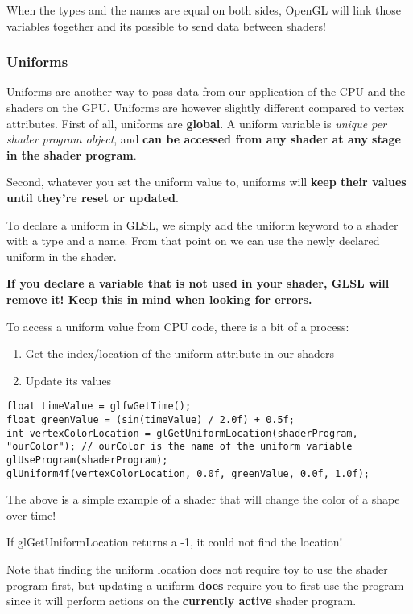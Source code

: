 \documentclass{article}
\begin{document}
When the types and the names are equal on both sides, OpenGL will link those variables together and its possible to send data between shaders!

\subsubsection{Uniforms}

Uniforms are another way to pass data from our application of the CPU and the shaders on the GPU. Uniforms are however slightly different compared to vertex attributes. First of all, uniforms are \textbf{global}. A uniform variable is \emph{unique per shader program object}, and \textbf{can be accessed from any shader at any stage in the shader program}.

Second, whatever you set the uniform value to, uniforms will \textbf{keep their values until they're reset or updated}.

To declare a uniform in GLSL, we simply add the uniform keyword to a shader with a type and a name. From that point on we can use the newly declared uniform in the shader. 

\textbf{If you declare a variable that is not used in your shader, GLSL will remove it! Keep this in mind when looking for errors.}

To access a uniform value from CPU code, there is a bit of a process:

\begin{enumerate}
    \item Get the index/location of the uniform attribute in our shaders
    \item Update its values
\end{enumerate}


\begin{Verbatim}
float timeValue = glfwGetTime();
float greenValue = (sin(timeValue) / 2.0f) + 0.5f;
int vertexColorLocation = glGetUniformLocation(shaderProgram, "ourColor"); // ourColor is the name of the uniform variable
glUseProgram(shaderProgram);
glUniform4f(vertexColorLocation, 0.0f, greenValue, 0.0f, 1.0f);
\end{Verbatim}

The above is a simple example of a shader that will change the color of a shape over time!

If glGetUniformLocation returns a -1, it could not find the location! 

Note that finding the uniform location does not require toy to use the shader program first, but updating a uniform \textbf{does} require you to first use the program since it will perform actions on the \textbf{currently active} shader program.
\end{document}
